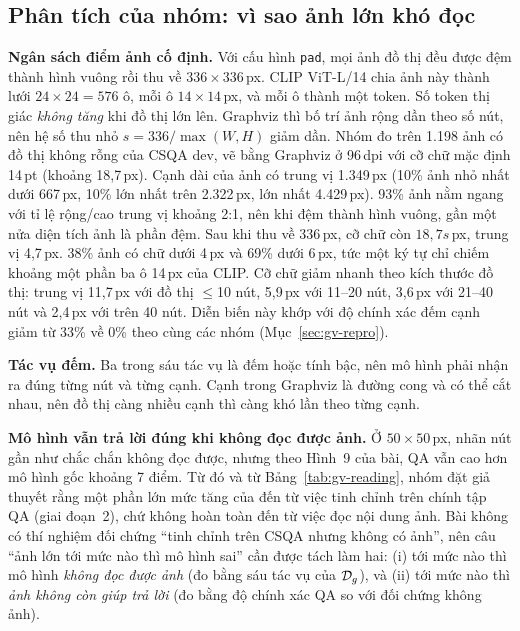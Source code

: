 \subsection{Phân tích của nhóm: vì sao ảnh lớn khó đọc}
\textbf{Ngân sách điểm ảnh cố định.} Với cấu hình \texttt{pad}, mọi ảnh đồ thị đều được đệm thành hình vuông rồi thu về $336\times336$\,px. CLIP ViT-L/14 chia ảnh này thành lưới $24\times24=576$ ô, mỗi ô $14\times14$\,px, và mỗi ô thành một token. Số token thị giác \emph{không tăng} khi đồ thị lớn lên. Graphviz thì bố trí ảnh rộng dần theo số nút, nên hệ số thu nhỏ $s=336/\max(W,H)$ giảm dần. Nhóm đo trên 1.198 ảnh có đồ thị không rỗng của CSQA dev, vẽ bằng Graphviz ở 96\,dpi với cỡ chữ mặc định 14\,pt (khoảng 18,7\,px). Cạnh dài của ảnh có trung vị 1.349\,px (10\% ảnh nhỏ nhất dưới 667\,px, 10\% lớn nhất trên 2.322\,px, lớn nhất 4.429\,px). 93\% ảnh nằm ngang với tỉ lệ rộng/cao trung vị khoảng 2:1, nên khi đệm thành hình vuông, gần một nửa diện tích ảnh là phần đệm. Sau khi thu về 336\,px, cỡ chữ còn $18{,}7s$\,px, trung vị 4,7\,px. 38\% ảnh có chữ dưới 4\,px và 69\% dưới 6\,px, tức một ký tự chỉ chiếm khoảng một phần ba ô 14\,px của CLIP. Cỡ chữ giảm nhanh theo kích thước đồ thị: trung vị 11,7\,px với đồ thị $\le$10 nút, 5,9\,px với 11--20 nút, 3,6\,px với 21--40 nút và 2,4\,px với trên 40 nút. Diễn biến này khớp với độ chính xác đếm cạnh giảm từ 33\% về 0\% theo cùng các nhóm (Mục~\ref{sec:gv-repro}).

\textbf{Tác vụ đếm.} Ba trong sáu tác vụ là đếm hoặc tính bậc, nên mô hình phải nhận ra đúng từng nút và từng cạnh. Cạnh trong Graphviz là đường cong và có thể cắt nhau, nên đồ thị càng nhiều cạnh thì càng khó lần theo từng cạnh.

\textbf{Mô hình vẫn trả lời đúng khi không đọc được ảnh.} Ở $50\times50$\,px, nhãn nút gần như chắc chắn không đọc được, nhưng theo Hình~9 của bài, QA vẫn cao hơn mô hình gốc khoảng 7 điểm. Từ đó và từ Bảng~\ref{tab:gv-reading}, nhóm đặt giả thuyết rằng một phần lớn mức tăng của \GV{} đến từ việc tinh chỉnh trên chính tập QA (giai đoạn~2), chứ không hoàn toàn đến từ việc đọc nội dung ảnh. Bài không có thí nghiệm đối chứng ``tinh chỉnh trên CSQA nhưng không có ảnh'', nên câu ``ảnh lớn tới mức nào thì mô hình sai'' cần được tách làm hai: (i) tới mức nào thì mô hình \emph{không đọc được ảnh} (đo bằng sáu tác vụ của $\mathcal{D}_g$), và (ii) tới mức nào thì \emph{ảnh không còn giúp trả lời} (đo bằng độ chính xác QA so với đối chứng không ảnh).

